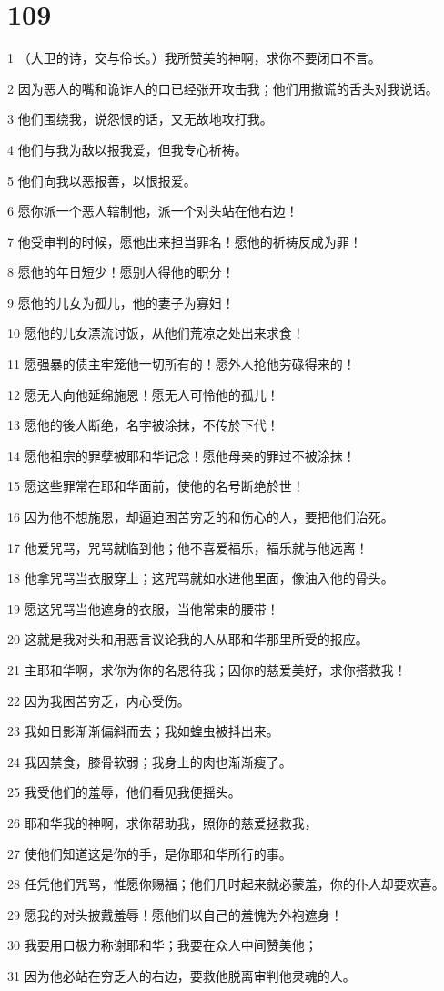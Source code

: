 \chapter{109}

\par 1 （大卫的诗，交与伶长。）我所赞美的神啊，求你不要闭口不言。
\par 2 因为恶人的嘴和诡诈人的口已经张开攻击我；他们用撒谎的舌头对我说话。
\par 3 他们围绕我，说怨恨的话，又无故地攻打我。
\par 4 他们与我为敌以报我爱，但我专心祈祷。
\par 5 他们向我以恶报善，以恨报爱。
\par 6 愿你派一个恶人辖制他，派一个对头站在他右边！
\par 7 他受审判的时候，愿他出来担当罪名！愿他的祈祷反成为罪！
\par 8 愿他的年日短少！愿别人得他的职分！
\par 9 愿他的儿女为孤儿，他的妻子为寡妇！
\par 10 愿他的儿女漂流讨饭，从他们荒凉之处出来求食！
\par 11 愿强暴的债主牢笼他一切所有的！愿外人抢他劳碌得来的！
\par 12 愿无人向他延绵施恩！愿无人可怜他的孤儿！
\par 13 愿他的後人断绝，名字被涂抹，不传於下代！
\par 14 愿他祖宗的罪孽被耶和华记念！愿他母亲的罪过不被涂抹！
\par 15 愿这些罪常在耶和华面前，使他的名号断绝於世！
\par 16 因为他不想施恩，却逼迫困苦穷乏的和伤心的人，要把他们治死。
\par 17 他爱咒骂，咒骂就临到他；他不喜爱福乐，福乐就与他远离！
\par 18 他拿咒骂当衣服穿上；这咒骂就如水进他里面，像油入他的骨头。
\par 19 愿这咒骂当他遮身的衣服，当他常束的腰带！
\par 20 这就是我对头和用恶言议论我的人从耶和华那里所受的报应。
\par 21 主耶和华啊，求你为你的名恩待我；因你的慈爱美好，求你搭救我！
\par 22 因为我困苦穷乏，内心受伤。
\par 23 我如日影渐渐偏斜而去；我如蝗虫被抖出来。
\par 24 我因禁食，膝骨软弱；我身上的肉也渐渐瘦了。
\par 25 我受他们的羞辱，他们看见我便摇头。
\par 26 耶和华我的神啊，求你帮助我，照你的慈爱拯救我，
\par 27 使他们知道这是你的手，是你耶和华所行的事。
\par 28 任凭他们咒骂，惟愿你赐福；他们几时起来就必蒙羞，你的仆人却要欢喜。
\par 29 愿我的对头披戴羞辱！愿他们以自己的羞愧为外袍遮身！
\par 30 我要用口极力称谢耶和华；我要在众人中间赞美他；
\par 31 因为他必站在穷乏人的右边，要救他脱离审判他灵魂的人。

